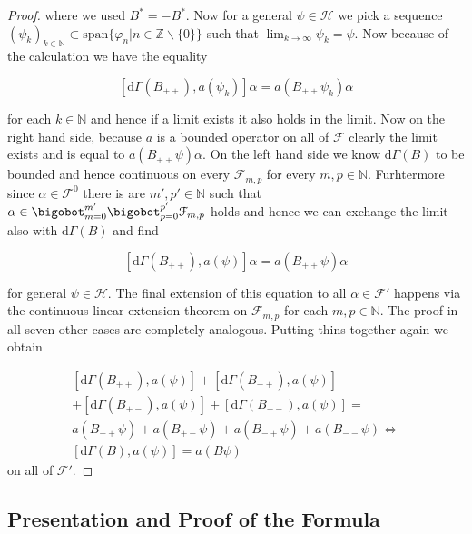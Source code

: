 \documentclass[b5paper,draft,openbib,12pt]{memoir}
\begin{document}
\begin{proof}
where we used \(B^*=-B^*\). Now for a general \(\psi\in\mathcal{H}\) we pick a sequence 
\((\psi_k)_{k\in\mathbb{N}}\subset \text{span}\{\varphi_{n}| n \in \mathbb{Z}\backslash\{0\}\}\)
such that \(\lim_{k\rightarrow \infty} \psi_k = \psi\). Now because of the calculation we have the equality

\begin{equation}
\left[ \mathrm{d}\Gamma(B_{++}),a(\psi_k) \right] \alpha =a(B_{++}\psi_k)\alpha
\end{equation}

for each \(k\in\mathbb{N}\) and hence if a limit exists it also holds in the limit. Now on the right hand side, because
\(a\) is a bounded operator on all of \(\mathcal{F}\) clearly the limit exists and is equal to \(a(B_{++}\psi)\alpha\).
On the left hand side we know \(\mathrm{d}\Gamma(B)\) to be bounded and hence continuous on every \(\mathcal{F}_{m,p}\)
for every \(m,p\in\mathbb{N}\).  Furhtermore since \(\alpha\in\mathcal{F}^0\) there is are \(m',p'\in\mathbb{N}\) such that 
\(\alpha \in \bigobot_{m=0}^{m'}\bigobot_{p=0}^{p'} \mathcal{F}_{m,p}\) holds and hence we can exchange the limit also 
with \(\mathrm{d}\Gamma(B)\) and find

\begin{equation}
\left[ \mathrm{d}\Gamma(B_{++}),a(\psi) \right] \alpha =a(B_{++}\psi)\alpha
\end{equation}

for general \(\psi\in\mathcal{H}\). The final extension of this equation to all \(\alpha \in \mathcal{F}'\) happens via the continuous linear
extension theorem on \(\mathcal{F}_{m,p}\) for each \(m,p\in\mathbb{N}\). The proof in all seven other cases are completely analogous.
Putting thins together again we obtain

\begin{align}
\left[ \mathrm{d}\Gamma(B_{++}),a(\psi) \right] +\left[ \mathrm{d}\Gamma(B_{-+}),a(\psi) \right] \\
+\left[ \mathrm{d}\Gamma(B_{+-}),a(\psi) \right] +\left[ \mathrm{d}\Gamma(B_{--}),a(\psi) \right]  =\\
a(B_{++}\psi)+a(B_{+-}\psi)+a(B_{-+}\psi)+a(B_{--}\psi)\iff \\
\left[ \mathrm{d}\Gamma(B),a(\psi) \right] =a(B\psi)
\end{align}
on all of \(\mathcal{F}'\).

\end{proof}

 

\subsection{Presentation and Proof of the Formula}\label{sec:proof simple formula}
\end{document}
